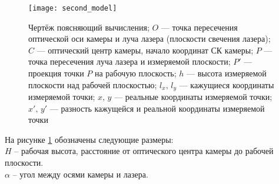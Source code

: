             \begin{figure}[H]
                \centering
                \texttt{[image: second\_model]}
                \caption{Чертёж поясняющий вычисления;
                         $O$ --- точка пересечения оптической оси камеры и луча лазера (плоскости свечения лазера);
                         $C$ --- оптический центр камеры, начало координат СК камеры;
                         $P$ --- точка пересечения луча лазера и измеряемой плоскости;
                         $P'$ --- проекция точки $ P $ на рабочую плоскость;
                         $h$ --- высота измеряемой плоскости над рабочей плоскостью;
                         $l_x,\,l_y$ --- кажущиеся координаты измеряемой точки;
                         $x,\,y$ --- реальные координаты измеряемой точки;
                         $x',\,y'$ --- разность кажущейся и реальной координаты измеряемой точки}
                 \label{pic:second_model}
            \end{figure}
            
            На рисунке \ref{pic:second_model} обозначены следующие размеры:\\
            $ H $ -- рабочая высота, расстояние от оптического центра камеры до рабочей плоскости.\\
            $ \alpha $ -- угол между осями камеры и лазера.
            
